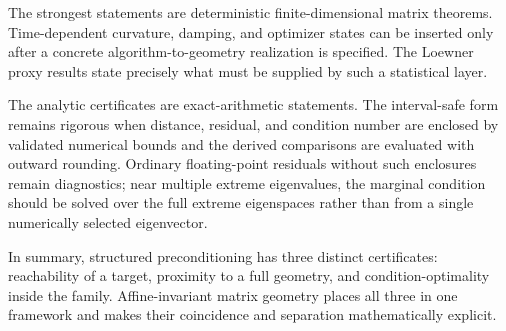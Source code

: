 The strongest statements are deterministic finite-dimensional matrix
theorems.  Time-dependent curvature, damping, and optimizer states can be
inserted only after a concrete algorithm-to-geometry realization is specified.
The Loewner proxy results state precisely what must be supplied by such a
statistical layer.

The analytic certificates are exact-arithmetic statements.  The interval-safe
form remains rigorous when distance, residual, and condition number are
enclosed by validated numerical bounds and the derived comparisons are
evaluated with outward rounding.  Ordinary floating-point residuals
without such enclosures remain diagnostics; near multiple extreme eigenvalues,
the marginal condition should be solved over the full extreme eigenspaces
rather than from a single numerically selected eigenvector.

In summary, structured preconditioning has three distinct certificates:
reachability of a target, proximity to a full geometry, and
condition-optimality inside the family.  Affine-invariant matrix geometry
places all three in one framework and makes their coincidence and separation
mathematically explicit.
